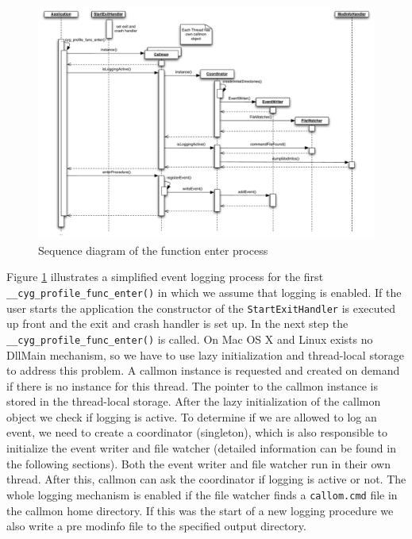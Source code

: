 \begin{figure}[ht]
\centering
\includegraphics[width=16cm]{images/callmon_sequence_diagram}
\caption{Sequence diagram of the function enter process}\label{fig:unixfe_figure2}
\end{figure}

Figure \ref{fig:unixfe_figure2} illustrates a simplified event logging process for the first \verb=__cyg_profile_func_enter()= in which we assume that logging is enabled. If the user starts the application the constructor of the \verb=StartExitHandler= is executed up front and the exit and crash handler is set up. In the next step the \verb=__cyg_profile_func_enter()= is called. On Mac OS X and Linux exists no DllMain mechanism, so we have to use lazy initialization and thread-local storage to address this problem. A callmon instance is requested and created on demand if there is no instance for this thread. The pointer to the callmon instance is stored in the thread-local storage. After the lazy	initialization of the callmon object we check if logging is active. To determine if we are allowed to log an event, we need to create a coordinator (singleton), which is also responsible to initialize the event writer and file watcher (detailed information can be found in the following sections). Both the event writer and file watcher run in their own thread. After this, callmon can ask the coordinator if logging is active or not. The whole logging mechanism is enabled if the file watcher finds a \verb=callom.cmd= file in the callmon home directory. If this was the start of a new logging procedure we also write a pre modinfo file to the specified output directory.

